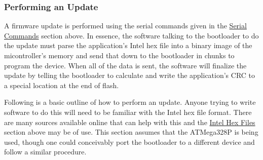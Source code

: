 \documentclass{article}
\begin{document}
\subsubsection{Performing an Update} \label{sssec:FWBootUpdate}
A firmware update is performed using the serial commands given in the
\hyperref[sssec:FWBootCommands]{Serial Commands} section above.  In essence, the software talking to
the bootloader to do the update must parse the application's Intel hex file into a binary image of
the micontroller's memory and send that down to the bootloader in chunks to program the device.
When all of the data is sent, the software will finalize the update by telling the bootloader to
calculate and write the application's CRC to a special location at the end of flash.

Following is a basic outline of how to perform an update.  Anyone trying to write software to do
this will need to be familiar with the Intel hex file format.  There are many sources available
online that can help with this and the \hyperref[ssec:FWIntelHex]{Intel Hex Files} section above may
be of use.  This section assumes that the ATMega328P is being used, though one could conceivably
port the bootloader to a different device and follow a similar procedure.
\end{document}

